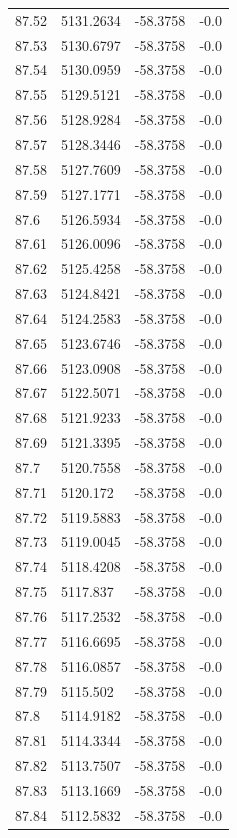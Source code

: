 \begin{table}[H]
\begin{tabular}{llll}
87.52 & 5131.2634 & -58.3758 & -0.0 \\
87.53 & 5130.6797 & -58.3758 & -0.0 \\
87.54 & 5130.0959 & -58.3758 & -0.0 \\
87.55 & 5129.5121 & -58.3758 & -0.0 \\
87.56 & 5128.9284 & -58.3758 & -0.0 \\
87.57 & 5128.3446 & -58.3758 & -0.0 \\
87.58 & 5127.7609 & -58.3758 & -0.0 \\
87.59 & 5127.1771 & -58.3758 & -0.0 \\
87.6 & 5126.5934 & -58.3758 & -0.0 \\
87.61 & 5126.0096 & -58.3758 & -0.0 \\
87.62 & 5125.4258 & -58.3758 & -0.0 \\
87.63 & 5124.8421 & -58.3758 & -0.0 \\
87.64 & 5124.2583 & -58.3758 & -0.0 \\
87.65 & 5123.6746 & -58.3758 & -0.0 \\
87.66 & 5123.0908 & -58.3758 & -0.0 \\
87.67 & 5122.5071 & -58.3758 & -0.0 \\
87.68 & 5121.9233 & -58.3758 & -0.0 \\
87.69 & 5121.3395 & -58.3758 & -0.0 \\
87.7 & 5120.7558 & -58.3758 & -0.0 \\
87.71 & 5120.172 & -58.3758 & -0.0 \\
87.72 & 5119.5883 & -58.3758 & -0.0 \\
87.73 & 5119.0045 & -58.3758 & -0.0 \\
87.74 & 5118.4208 & -58.3758 & -0.0 \\
87.75 & 5117.837 & -58.3758 & -0.0 \\
87.76 & 5117.2532 & -58.3758 & -0.0 \\
87.77 & 5116.6695 & -58.3758 & -0.0 \\
87.78 & 5116.0857 & -58.3758 & -0.0 \\
87.79 & 5115.502 & -58.3758 & -0.0 \\
87.8 & 5114.9182 & -58.3758 & -0.0 \\
87.81 & 5114.3344 & -58.3758 & -0.0 \\
87.82 & 5113.7507 & -58.3758 & -0.0 \\
87.83 & 5113.1669 & -58.3758 & -0.0 \\
87.84 & 5112.5832 & -58.3758 & -0.0 \\

\end{tabular}
\end{table}

